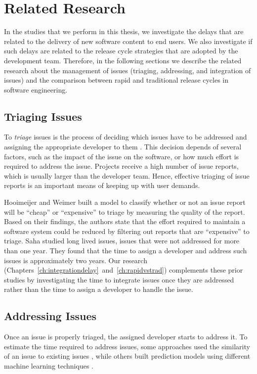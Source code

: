 \chapter[Related Research]{Related Research} \label{ch:relatedwork}

In the studies that we perform in this thesis, we investigate the delays that are related to the
delivery of new software content to end users. We also investigate if such delays are related to the
release cycle strategies that are adopted by the development team. Therefore, in the following
sections we describe the related research about the management of issues (\ie triaging, addressing,
and integration of issues) and the comparison between rapid and traditional release cycles in
software engineering.

\section{Triaging Issues}
To \textit{triage} issues is the process of deciding which issues have to be addressed and assigning
the appropriate developer to them \cite{Anvik2006}. This decision depends of several factors, such
as the impact of the issue on the software, or how much effort is required to address the issue.
Projects receive a high number of issue reports, which is usually larger than the developer team.
Hence, effective triaging of issue reports is an important means of keeping up with user demands. 

Hooimeijer and Weimer \cite{Hooimeijer2007} built a model to classify whether or not an issue report
will be ``cheap'' or ``expensive'' to triage by measuring the quality of the report. Based on their
findings, the authors state that the effort required to maintain a software system could be reduced
by filtering out reports that are ``expensive'' to triage. Saha \etal \cite{Saha2014} studied long
lived issues, \ie issues that were not addressed for more than one year. They found that the time to
assign a developer and address such issues is approximately two years. Our research
(Chapters~\ref{ch:integrationdelay}~and~\ref{ch:rapidvstrad}) complements these prior studies by
investigating the time to integrate issues once they are addressed rather than the time to assign a
developer to handle the issue.

\section{Addressing Issues}
Once an issue is properly triaged, the assigned developer starts to address it. To estimate the time
required to address issues, some approaches used the similarity of an issue to existing issues
\cite{Weib2007,Zhang2013}, while others built prediction models using different machine learning
techniques \cite{Panjer2007,Anbalagan2009,Giger2010, Marks2011}. 

